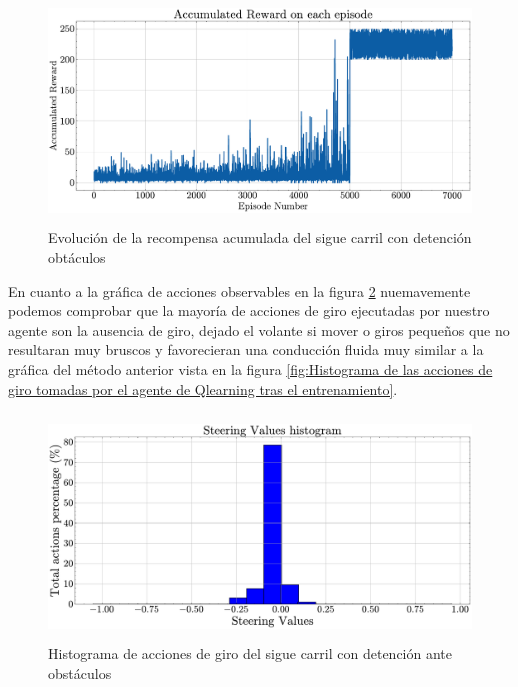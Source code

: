   \begin{figure}[h]
    \centering
    \includegraphics[height=6cm]{imagenes/cap4/evita_obstaculos_qlearning/recompense.pdf}
    \caption{Evolución de la recompensa acumulada del sigue carril con detención obtáculos}
    \label{fig:Evolución de la recompensa acumulada del algoritmo sigue carril con reacción a obtáculos}
\end{figure}


En cuanto a la gráfica de acciones observables en la figura \ref{fig:Histograma de acciones del algoritmo sigue carril con reacción ante obstáculos} nuemavemente podemos comprobar que la mayoría de acciones de giro ejecutadas por nuestro agente son la ausencia de giro, dejado el volante si mover o giros pequeños que no resultaran muy bruscos y favorecieran una conducción fluida muy similar a la gráfica del método anterior vista en la figura \ref{fig:Histograma de las acciones de giro tomadas por el agente de Qlearning tras el entrenamiento}.

  \begin{figure}[t]
    \centering
    \includegraphics[height=6cm]{imagenes/cap4/evita_obstaculos_qlearning/actions.pdf}
    \caption{Histograma de acciones de giro del sigue carril con detención ante obstáculos}
    \label{fig:Histograma de acciones del algoritmo sigue carril con reacción ante obstáculos}
\end{figure}
        


